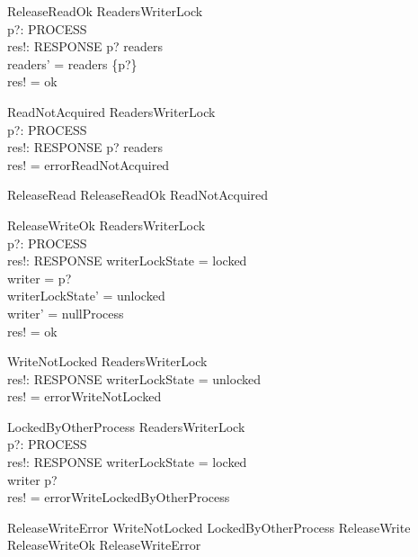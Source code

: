 \documentclass{article}
\begin{document}
\begin{schema}{ReleaseReadOk}
    \Delta ReadersWriterLock \\
    p?: PROCESS \\
    res!: RESPONSE
\where
    p? \in readers \\
    readers' = readers \setminus \{p?\} \\
    res! = ok
\end{schema}

\begin{schema}{ReadNotAcquired}
    \Xi ReadersWriterLock \\
    p?: PROCESS \\
    res!: RESPONSE
\where
    p? \notin readers \\
    res! = errorReadNotAcquired
\end{schema}

\begin{zed}
ReleaseRead  ReleaseReadOk \lor ReadNotAcquired
\end{zed}

\begin{schema}{ReleaseWriteOk}
    \Delta ReadersWriterLock \\
    p?: PROCESS \\
    res!: RESPONSE
\where
    writerLockState = locked \\
    writer = p? \\
    writerLockState' = unlocked \\
    writer' = nullProcess \\
    res! = ok
\end{schema}

\begin{schema}{WriteNotLocked}
    \Xi ReadersWriterLock \\
    res!: RESPONSE
\where
    writerLockState = unlocked \\
    res! = errorWriteNotLocked
\end{schema}


\begin{schema}{LockedByOtherProcess}
    \Xi ReadersWriterLock \\
    p?: PROCESS \\
    res!: RESPONSE
\where
    writerLockState = locked \\
    writer \neq p? \\
    res! = errorWriteLockedByOtherProcess
\end{schema}

\begin{zed}
ReleaseWriteError  WriteNotLocked \lor LockedByOtherProcess 
\also
ReleaseWrite  ReleaseWriteOk \lor ReleaseWriteError
\end{zed}
\end{document}
